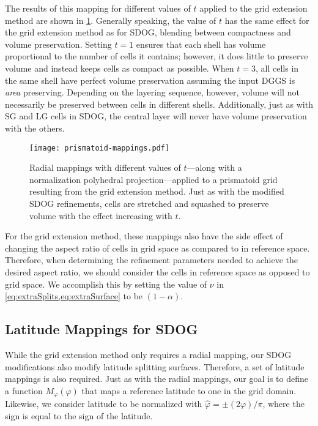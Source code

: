 The results of this mapping for different values of $t$ applied to the grid extension method are shown in \cref{fig:prismatoid-mappings}.
Generally speaking, the value of $t$ has the same effect for the grid extension method as for SDOG, blending between compactness and volume preservation.
Setting $t=1$ ensures that each shell has volume proportional to the number of cells it contains; however, it does little to preserve volume and instead keeps cells as compact as possible.
When $t=3$, all cells in the same shell have perfect volume preservation assuming the input DGGS is \textit{area} preserving.
Depending on the layering sequence, however, volume will not necessarily be preserved between cells in different shells.
Additionally, just as with SG and LG cells in SDOG, the central layer will never have volume preservation with the others.


\begin{figure}[htb!]
	\centering
	\texttt{[image: prismatoid-mappings.pdf]}
	\caption[Radial mappings applied to the grid extension method]{
		Radial mappings with different values of $t$---along with a normalization polyhedral projection---applied to a prismatoid grid resulting from the grid extension method.
		Just as with the modified SDOG refinements, cells are stretched and squashed to preserve volume with the effect increasing with $t$.
	}
	\label{fig:prismatoid-mappings}
\end{figure}


For the grid extension method, these mappings also have the side effect of changing the aspect ratio of cells in grid space as compared to in reference space.
Therefore, when determining the refinement parameters needed to achieve the desired aspect ratio, we should consider the cells in reference space as opposed to grid space.
We accomplish this by setting the value of $\nu$ in \cref{eq:extraSplits,eq:extraSurface} to be $(1 - \alpha)$.


\subsection{Latitude Mappings for SDOG} \label{chap:6:latitude}
While the grid extension method only requires a radial mapping, our SDOG modifications also modify latitude splitting surfaces.
Therefore, a set of latitude mappings is also required.
Just as with the radial mappings, our goal is to define a function $M_\varphi(\varphi)$ that maps a reference latitude to one in the grid domain. Likewise, we consider latitude to be normalized with $\hat{\varphi} = \pm (2\varphi) / \pi$, where the sign is equal to the sign of the latitude.


